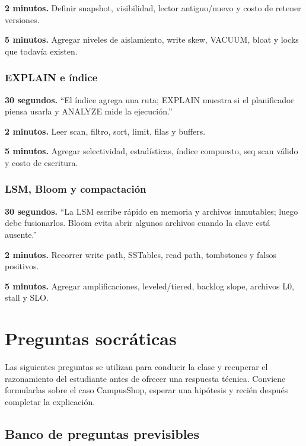 \documentclass[variant=docente,cover=institutional,mode=screen]{ua-engineering-v6-article}
\begin{document}
\textbf{2 minutos.} Definir snapshot, visibilidad, lector antiguo/nuevo y costo de retener versiones.

\textbf{5 minutos.} Agregar niveles de aislamiento, write skew, VACUUM, bloat y locks que todavía existen.

\subsubsection*{EXPLAIN e índice}

\textbf{30 segundos.} ``El índice agrega una ruta; EXPLAIN muestra si el planificador piensa usarla y ANALYZE mide la ejecución.''

\textbf{2 minutos.} Leer scan, filtro, sort, limit, filas y buffers.

\textbf{5 minutos.} Agregar selectividad, estadísticas, índice compuesto, seq scan válido y costo de escritura.

\subsubsection*{LSM, Bloom y compactación}

\textbf{30 segundos.} ``La LSM escribe rápido en memoria y archivos inmutables; luego debe fusionarlos. Bloom evita abrir algunos archivos cuando la clave está ausente.''

\textbf{2 minutos.} Recorrer write path, SSTables, read path, tombstones y falsos positivos.

\textbf{5 minutos.} Agregar amplificaciones, leveled/tiered, backlog slope, archivos L0, stall y SLO.

\section{Preguntas socráticas}

Las siguientes preguntas se utilizan para conducir la clase y recuperar el razonamiento del estudiante antes de ofrecer una respuesta técnica. Conviene formularlas sobre el caso CampusShop, esperar una hipótesis y recién después completar la explicación.

\subsection{Banco de preguntas previsibles}
\end{document}
